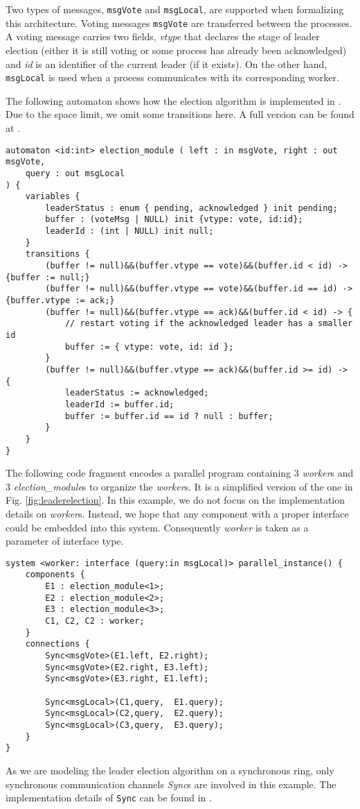 Two types of messages, \texttt{msgVote} and \texttt{msgLocal}, are supported when formalizing this architecture. Voting messages \texttt{msgVote} are transferred between the processes. A voting message carries two fields, \emph{vtype} that declares the stage of leader election (either it is still voting or some process has already been acknowledged) and \emph{id} is an identifier of the current leader (if it exists). On the other hand, \texttt{msgLocal} is used when a process communicates with its corresponding worker.
\begin{example} The following automaton shows how the election algorithm is implemented in \lang{}. Due to the space limit, we omit some transitions here. A full version can be found at \cite{medmodels}.
\begin{lstlisting}[basicstyle=\scriptsize\ttfamily]
automaton <id:int> election_module ( left : in msgVote, right : out msgVote,
	query : out msgLocal
) {
	variables {
		leaderStatus : enum { pending, acknowledged } init pending;
		buffer : (voteMsg | NULL) init {vtype: vote, id:id};
		leaderId : (int | NULL) init null;
	}
	transitions {
		(buffer != null)&&(buffer.vtype == vote)&&(buffer.id < id) -> {buffer := null;}
		(buffer != null)&&(buffer.vtype == vote)&&(buffer.id == id) -> {buffer.vtype := ack;}
		(buffer != null)&&(buffer.vtype == ack)&&(buffer.id < id) -> {
			// restart voting if the acknowledged leader has a smaller id
			buffer := { vtype: vote, id: id };
		}
		(buffer != null)&&(buffer.vtype == ack)&&(buffer.id >= id) -> {
			leaderStatus := acknowledged;
			leaderId := buffer.id;
			buffer := buffer.id == id ? null : buffer;
		}
	}
}
\end{lstlisting}
\end{example}


The following code fragment encodes a parallel program containing 3 \emph{worker}s and 3 \emph{election\_module}s to organize the \emph{worker}s. It is a simplified version of the one in Fig. \ref{fig:leaderelection}. In this example, we do not focus on the implementation details on \emph{worker}s. Instead, we hope that any component with a proper interface could be embedded into this system. Consequently \emph{worker} is taken as a parameter of interface type.

\begin{lstlisting}[basicstyle=\scriptsize\ttfamily]
system <worker: interface (query:in msgLocal)> parallel_instance() {
	components {
		E1 : election_module<1>;
		E2 : election_module<2>;
		E3 : election_module<3>;
		C1, C2, C2 : worker;
	}	
	connections {
		Sync<msgVote>(E1.left, E2.right);
		Sync<msgVote>(E2.right, E3.left);
		Sync<msgVote>(E3.right,	E1.left);
		
		Sync<msgLocal>(C1,query,  E1.query);
		Sync<msgLocal>(C2,query,  E2.query);
		Sync<msgLocal>(C3,query,  E3.query);
	}
}
\end{lstlisting}

As we are modeling the leader election algorithm on a synchronous ring, only synchronous communication channels \emph{Sync}s are involved in this example. The implementation details of \texttt{Sync} can be found in  \cite{medmodels}.